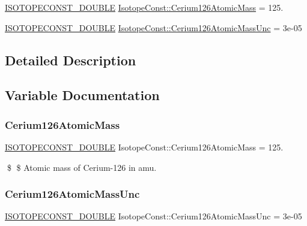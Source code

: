 \begin{DoxyCompactItemize}
\item 
\mbox{\hyperlink{group___isotope_const-_macros_ga8f45a7272ce02c0b4c65c44636ed719a}{I\+S\+O\+T\+O\+P\+E\+C\+O\+N\+S\+T\+\_\+\+D\+O\+U\+B\+LE}} \mbox{\hyperlink{group___isotope_const-_cerium-_ce126_ga6cd3236133c63cf10babdb417442cf75}{Isotope\+Const\+::\+Cerium126\+Atomic\+Mass}} = 125.
\item 
\mbox{\hyperlink{group___isotope_const-_macros_ga8f45a7272ce02c0b4c65c44636ed719a}{I\+S\+O\+T\+O\+P\+E\+C\+O\+N\+S\+T\+\_\+\+D\+O\+U\+B\+LE}} \mbox{\hyperlink{group___isotope_const-_cerium-_ce126_gaebcfaa4b3a5b17b4d10e480d3726e5c0}{Isotope\+Const\+::\+Cerium126\+Atomic\+Mass\+Unc}} = 3e-\/05
\end{DoxyCompactItemize}


\subsection{Detailed Description}


\subsection{Variable Documentation}
\mbox{\label{group___isotope_const-_cerium-_ce126_ga6cd3236133c63cf10babdb417442cf75}} 
\subsubsection{\texorpdfstring{Cerium126\+Atomic\+Mass}{Cerium126AtomicMass}}
{\footnotesize\ttfamily \mbox{\hyperlink{group___isotope_const-_macros_ga8f45a7272ce02c0b4c65c44636ed719a}{I\+S\+O\+T\+O\+P\+E\+C\+O\+N\+S\+T\+\_\+\+D\+O\+U\+B\+LE}} Isotope\+Const\+::\+Cerium126\+Atomic\+Mass = 125.}

\$ \$ Atomic mass of Cerium-\/126 in amu. \mbox{\label{group___isotope_const-_cerium-_ce126_gaebcfaa4b3a5b17b4d10e480d3726e5c0}} 
\subsubsection{\texorpdfstring{Cerium126\+Atomic\+Mass\+Unc}{Cerium126AtomicMassUnc}}
{\footnotesize\ttfamily \mbox{\hyperlink{group___isotope_const-_macros_ga8f45a7272ce02c0b4c65c44636ed719a}{I\+S\+O\+T\+O\+P\+E\+C\+O\+N\+S\+T\+\_\+\+D\+O\+U\+B\+LE}} Isotope\+Const\+::\+Cerium126\+Atomic\+Mass\+Unc = 3e-\/05}

